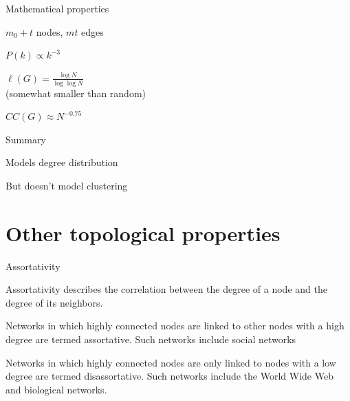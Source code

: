 \begin{frame}{Mathematical properties}

\BI
\item $m_0+t$ nodes, $mt$ edges
\item $P(k) \propto k^{-3}$
\item $\ell(G) = \frac{\log N}{\log \log N}$\\
  (somewhat smaller than random)
\item $CC(G) \approx N^{-0.75}$
\EI

\begin{block}{Summary}
\BI
\item Models degree distribution
\item But doesn’t model clustering
\EI
\end{block}

\end{frame}

\section{Other topological properties}

\begin{frame}{Assortativity}

\BI
\item \alert{Assortativity} describes the correlation between the degree of a node and the degree of its neighbors. 
\item Networks in which highly connected nodes are linked to other nodes with a high degree are termed \alert{assortative}. Such networks include social networks
\item Networks in which highly connected nodes are only linked to nodes with a low degree are termed \alert{disassortative}. Such networks include the World Wide Web and biological networks.
\EI

\end{frame}

